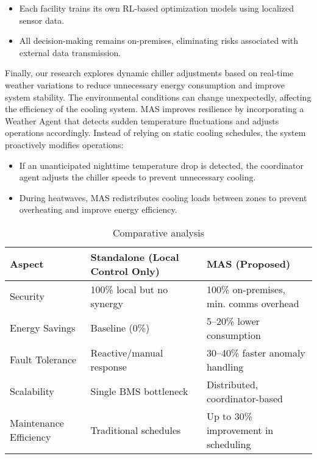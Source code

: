 \documentclass{svproc}
\begin{document}
\begin{itemize} 
\item Each facility trains its own RL-based optimization models using localized sensor data.
\item All decision-making remains on-premises, eliminating risks associated with external data transmission.
\end{itemize}

Finally, our research explores dynamic chiller adjustments based on real-time weather variations to reduce unnecessary energy consumption and improve system stability. The environmental conditions can change unexpectedly, affecting the efficiency of the cooling system. MAS improves resilience by incorporating a Weather Agent that detects sudden temperature fluctuations and adjusts operations accordingly. Instead of relying on static cooling schedules, the system proactively modifies operations:

\begin{itemize} 
\item If an unanticipated nighttime temperature drop is detected, the coordinator agent adjusts the chiller speeds to prevent unnecessary cooling.
\item During heatwaves, MAS redistributes cooling loads between zones to prevent overheating and improve energy efficiency.
\end{itemize}


\begin{table}[h]
    \centering
    \begin{tabular}{|l|l|l|}
        \hline
        \textbf{Aspect} & \textbf{Standalone (Local Control Only)} & \textbf{MAS (Proposed)} \\
        \hline
        Security & 100\% local but no synergy & 100\% on-premises, min. comms overhead \\
        \hline
        Energy Savings & Baseline (0\%) & 5--20\% lower consumption \\
        \hline
        Fault Tolerance & Reactive/manual response & 30--40\% faster anomaly handling \\
        \hline
        Scalability & Single BMS bottleneck & Distributed, coordinator-based \\
        \hline
        Maintenance Efficiency & Traditional schedules & Up to 30\% improvement in scheduling \\
        \hline
    \end{tabular}
    \caption{Comparative analysis}
    \label{tab:comparison}
\end{table}
\end{document}
